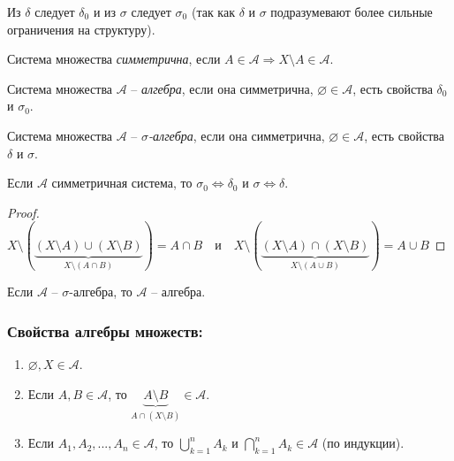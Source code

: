 \begin{remark}
    Из $\delta$ следует $\delta_0$ и из $\sigma$ следует $\sigma_0$ (так как $\delta$ и $\sigma$ подразумевают 
    более сильные ограничения на структуру).
\end{remark}

\begin{definition}
    Система множества \textit{симметрична}, если $A\in \mathcal{A}\Rightarrow X\setminus A\in \mathcal{A}$.
\end{definition}

\begin{definition}
    Система множества $\mathcal{A}$ – \textit{алгебра}, если она симметрична, $\varnothing \in \mathcal{A}$, есть свойства $\delta_0$ и $\sigma_0$.
\end{definition}

\begin{definition}
    Система множества $\mathcal{A}$ – \textit{$\sigma$-алгебра}, если она симметрична, $\varnothing \in \mathcal{A}$, есть свойства $\delta$ и $\sigma$.
\end{definition}

\begin{statement}
    Если $\mathcal{A}$ симметричная система, то $\sigma_0\Leftrightarrow \delta_0$ и $\sigma\Leftrightarrow \delta$.
\end{statement}

\begin{proof}
    $X\setminus (\underbrace{(X\setminus A)\cup (X\setminus B)}_{X\setminus (A\cap B)})= A\cap B\quad\text{и}\quad
    X\setminus (\underbrace{(X\setminus A)\cap (X\setminus B)}_{X\setminus (A\cup B)})= A\cup B$
\end{proof}

\begin{remark}
    Если $\mathcal{A}$ – $\sigma$-алгебра, то $\mathcal{A}$ – алгебра.
\end{remark}

\subsubsection*{Свойства алгебры множеств:}

\begin{enumerate}
    \item $\varnothing, X\in \mathcal{A}$.
    \item Если $A, B \in \mathcal{A}$, то $\underbrace{A\setminus B}_{A\cap (X \setminus B)}\in \mathcal{A}$.
    \item Если $A_1, A_2, ..., A_n\in \mathcal{A}$, то $\bigcup\limits_{k = 1}^n A_k$ и $\bigcap\limits_{k = 1}^n A_k\in \mathcal{A}$ (по индукции).
\end{enumerate}

